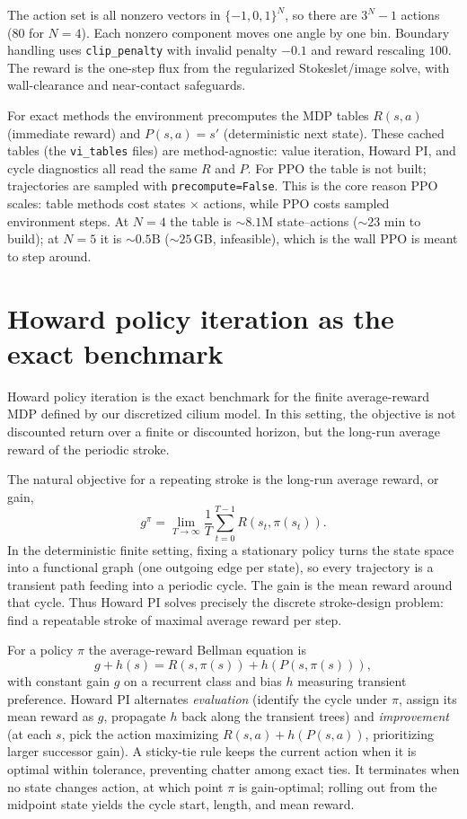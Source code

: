 \documentclass[11pt]{article}
\begin{document}
The action set is all nonzero vectors in $\{-1,0,1\}^N$, so there are $3^N-1$
actions (80 for $N=4$). Each nonzero component moves one angle by one bin.
Boundary handling uses \texttt{clip\_penalty} with invalid penalty $-0.1$ and
reward rescaling $100$. The reward is the one-step flux from the regularized
Stokeslet/image solve, with wall-clearance and near-contact safeguards.

For exact methods the environment precomputes the MDP tables
$R(s,a)$ (immediate reward) and $P(s,a)=s'$ (deterministic next state). These
cached tables (the \texttt{vi\_tables} files) are method-agnostic: value
iteration, Howard PI, and cycle diagnostics all read the same $R$ and $P$.
For PPO the table is not built; trajectories are sampled with
\texttt{precompute=False}. This is the core reason PPO scales: table methods
cost states $\times$ actions, while PPO costs sampled environment steps. At
$N=4$ the table is $\sim 8.1\mathrm{M}$ state--actions ($\sim 23$ min to build);
at $N=5$ it is $\sim 0.5\mathrm{B}$ ($\sim 25$\,GB, infeasible), which is the
wall PPO is meant to step around.

\section{Howard policy iteration as the exact benchmark}

Howard policy iteration \cite{howard1960,puterman1994} is the exact benchmark
for the finite average-reward MDP defined by our discretized cilium model. In
this setting, the objective is not discounted return over a finite or
discounted horizon, but the long-run average reward of the periodic stroke.

The natural objective for a repeating stroke is the long-run average reward, or
gain,
\[
    g^\pi = \lim_{T\to\infty}\frac1T\sum_{t=0}^{T-1} R(s_t,\pi(s_t)).
\]
In the deterministic finite setting, fixing a stationary policy turns the state
space into a functional graph (one outgoing edge per state), so every
trajectory is a transient path feeding into a periodic cycle. The gain is the
mean reward around that cycle. Thus Howard PI solves precisely the discrete
stroke-design problem: find a repeatable stroke of maximal average reward per
step.

For a policy $\pi$ the average-reward Bellman equation is
\cite{puterman1994,bertsekas2012dpoc}
\[
    g + h(s) = R(s,\pi(s)) + h(P(s,\pi(s))),
\]
with constant gain $g$ on a recurrent class and bias $h$ measuring transient
preference. Howard PI alternates \emph{evaluation} (identify the cycle under
$\pi$, assign its mean reward as $g$, propagate $h$ back along the transient
trees) and \emph{improvement} (at each $s$, pick the action maximizing
$R(s,a)+h(P(s,a))$, prioritizing larger successor gain). A sticky-tie rule
keeps the current action when it is optimal within tolerance, preventing
chatter among exact ties. It terminates when no state changes action, at which
point $\pi$ is gain-optimal; rolling out from the midpoint state yields the
cycle start, length, and mean reward.
\end{document}
